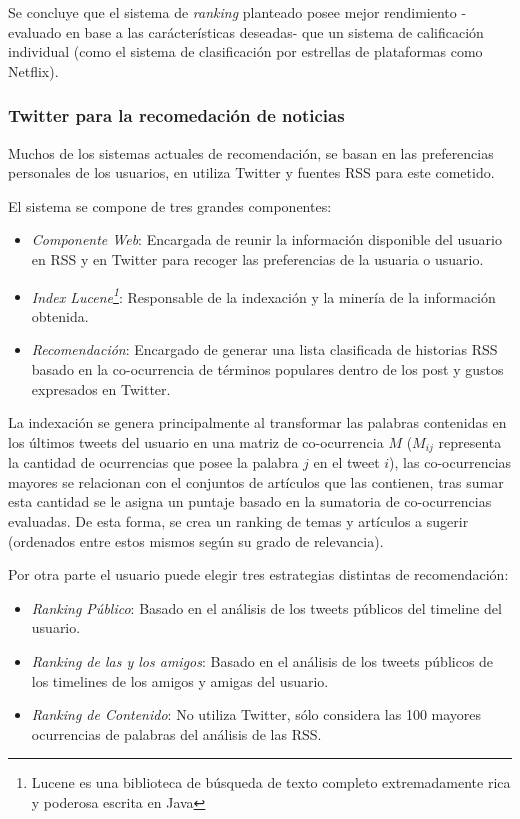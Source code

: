 	Se concluye que el sistema de \emph{ranking} planteado posee mejor rendimiento -evaluado en base a las carácterísticas deseadas- que un sistema de calificación individual (como el sistema de clasificación por estrellas de plataformas como Netflix).
	
\subsubsection{Twitter para la recomedación de noticias}

	Muchos de los sistemas actuales de recomendación, se basan en las preferencias personales de los usuarios, en \cite{Phelan:2009:UTR:1639714.1639794} utiliza Twitter y fuentes RSS para este cometido.
	
	El sistema se compone de tres grandes componentes:
	\begin{itemize}
		\item \textit{Componente Web}: Encargada de reunir la información disponible del usuario en RSS y en Twitter para recoger las preferencias de la usuaria o usuario.
		\item \textit{Index Lucene\footnote{Lucene es una biblioteca de búsqueda de texto completo extremadamente rica y poderosa escrita en Java}}: Responsable de la indexación y la minería de la información obtenida.
		\item \textit{Recomendación}: Encargado de generar una lista clasificada de historias RSS basado en la co-ocurrencia de términos populares dentro de los post y gustos expresados en Twitter.
	\end{itemize}
	
	La indexación se genera principalmente al transformar las palabras contenidas en los últimos tweets del usuario en una matriz de co-ocurrencia $M$ ($M_{ij}$ representa la cantidad de ocurrencias que posee la palabra $j$ en
	el tweet $i$), las co-ocurrencias mayores se relacionan con el conjuntos de artículos que las contienen, tras sumar esta cantidad se le asigna un puntaje basado en la sumatoria de co-ocurrencias evaluadas. De esta forma, se crea un ranking de temas y artículos a sugerir (ordenados entre estos mismos según su grado de relevancia). 
	
	Por otra parte el usuario puede elegir tres estrategias distintas de recomendación: 
	
	\begin{itemize}
		\item \textit{Ranking Público}: Basado en el análisis de los tweets públicos del timeline del usuario.
		\item \textit{Ranking de las y los amigos}: Basado en el análisis de los tweets públicos de los timelines de los amigos y amigas del usuario.
		\item \textit{Ranking de Contenido}: No utiliza Twitter, sólo considera las 100 mayores ocurrencias de palabras del análisis de las RSS.
	\end{itemize}
   

